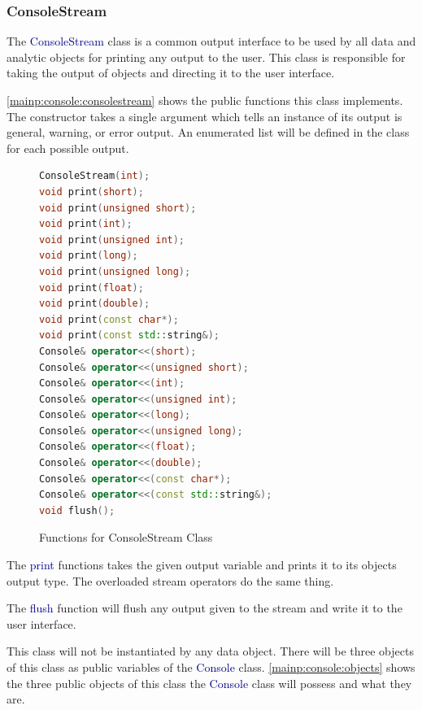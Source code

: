 \documentclass[10pt]{article}
\providecommand{\h}[1]{\textcolor{darkblue}{#1}}
\begin{document}
\subsubsection{ConsoleStream}

The \h{ConsoleStream} class is a common output interface to be used by all data 
and analytic objects for printing any output to the user. This class is 
responsible for taking the output of objects and directing it to the user 
interface.

\autoref{mainp:console:consolestream} shows the public functions this class 
implements. The constructor takes a single argument which tells an instance of 
its output is general, warning, or error output. An enumerated list will be 
defined in the class for each possible output.

\begin{figure}[H]
\begin{mdframed}[style=functions]
\begin{lstlisting}[language=C++]
ConsoleStream(int);
void print(short);
void print(unsigned short);
void print(int);
void print(unsigned int);
void print(long);
void print(unsigned long);
void print(float);
void print(double);
void print(const char*);
void print(const std::string&);
Console& operator<<(short);
Console& operator<<(unsigned short);
Console& operator<<(int);
Console& operator<<(unsigned int);
Console& operator<<(long);
Console& operator<<(unsigned long);
Console& operator<<(float);
Console& operator<<(double);
Console& operator<<(const char*);
Console& operator<<(const std::string&);
void flush();
\end{lstlisting}
\end{mdframed}
\caption{Functions for ConsoleStream Class}
\label{mainp:console:consolestream}
\end{figure}

The \h{print} functions takes the given output variable and prints it to its 
objects output type. The overloaded stream operators do the same thing.

The \h{flush} function will flush any output given to the stream and write it 
to the user interface.

This class will not be instantiated by any data object. There will be three 
objects of this class as public variables of the \h{Console} class. 
\autoref{mainp:console:objects} shows the three public objects of this class 
the \h{Console} class will possess and what they are.
\end{document}
